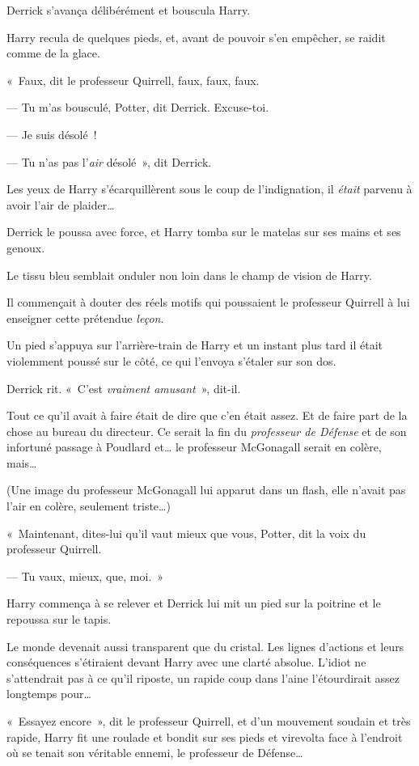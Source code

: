 Derrick s'avança délibérément et bouscula Harry.

Harry recula de quelques pieds, et, avant de pouvoir s'en empêcher, se raidit comme de la glace.

«~Faux, dit le professeur Quirrell, faux, faux, faux.

--- Tu m'as bousculé, Potter, dit Derrick.
Excuse-toi.

--- Je suis désolé~!

--- Tu n'as pas l'\emph{air} désolé~», dit Derrick.

Les yeux de Harry s'écarquillèrent sous le coup de l'indignation, il \emph{était} parvenu à avoir l'air de plaider…

Derrick le poussa avec force, et Harry tomba sur le matelas sur ses mains et ses genoux.

Le tissu bleu semblait onduler non loin dans le champ de vision de Harry.

Il commençait à douter des réels motifs qui poussaient le professeur Quirrell à lui enseigner cette prétendue \emph{leçon}.

Un pied s'appuya sur l'arrière-train de Harry et un instant plus tard il était violemment poussé sur le côté, ce qui l'envoya s'étaler sur son dos.

Derrick rit.
«~C'est \emph{vraiment amusant}~», dit-il.

Tout ce qu'il avait à faire était de dire que c'en était assez.
Et de faire part de la chose au bureau du directeur.
Ce serait la fin du \emph{professeur de Défense} et de son infortuné passage à Poudlard et… le professeur McGonagall serait en colère, mais…

(Une image du professeur McGonagall lui apparut dans un flash, elle n'avait pas l'air en colère, seulement triste…)

«~Maintenant, dites-lui qu'il vaut mieux que vous, Potter, dit la voix du professeur Quirrell.

--- Tu vaux, mieux, que, moi.~»

Harry commença à se relever et Derrick lui mit un pied sur la poitrine et le repoussa sur le tapis.

Le monde devenait aussi transparent que du cristal.
Les lignes d'actions et leurs conséquences s'étiraient devant Harry avec une clarté absolue.
L'idiot ne s'attendrait pas à ce qu'il riposte, un rapide coup dans l'aine l'étourdirait assez longtemps pour…

«~Essayez encore~», dit le professeur Quirrell, et d'un mouvement soudain et très rapide, Harry fit une roulade et bondit sur ses pieds et virevolta face à l'endroit où se tenait son véritable ennemi, le professeur de Défense…

